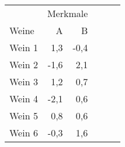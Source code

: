 \begin{tabular}{lrrrrr}
    \toprule
    & \multicolumn{2}{c}{Merkmale} \\
    \cmidrule(lr){2-3}
    Weine & A & B \\ 
    \midrule
    Wein 1  & 1,3 & -0,4  \\
    Wein 2 & -1,6 & 2,1 \\
    Wein 3 & 1,2 & 0,7 \\
    Wein 4 & -2,1 & 0,6 \\
    Wein 5 & 0,8 & 0,6 \\
    Wein 6 & -0,3 & 1,6 \\
    \bottomrule
\end{tabular}